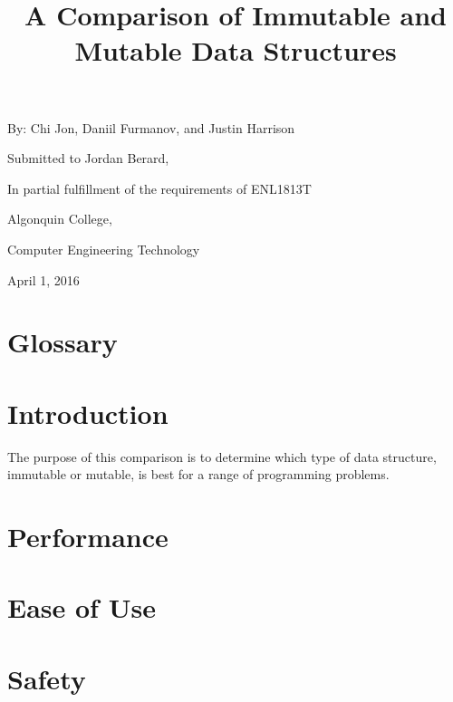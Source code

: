 \documentclass{article}
\title{A Comparison of Immutable and Mutable Data Structures}
\author{}
\date{}
\begin{document}
\maketitle

\begin{center}
By:  Chi Jon, Daniil Furmanov, and Justin Harrison

\hfill

Submitted to Jordan Berard,

In partial fulfillment of the requirements of ENL1813T

\hfill

Algonquin College,

Computer Engineering Technology

\hfill

April 1, 2016
\end{center}

\section{Glossary}

\section{Introduction}
The purpose of this comparison is to determine which type of data structure,
immutable or mutable, is best for a range of programming problems.

\section{Performance}

\section{Ease of Use}

\section{Safety}
\end{document}
